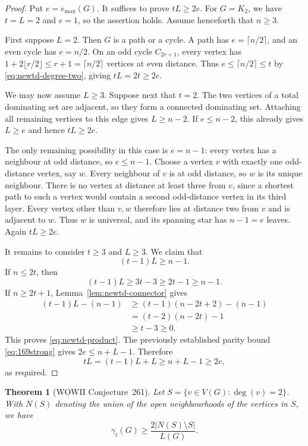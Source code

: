 \documentclass[11pt,a4paper]{article}
\newtheorem{theorem}{Theorem}[section]
\theoremstyle{remark}
\begin{document}
\begin{proof}
Put $e=e_{\max}(G)$. It suffices to prove $tL\geq 2e$.
For $G=K_2$, we have $t=L=2$ and $e=1$, so the assertion holds.
Assume henceforth that $n\geq 3$.

First suppose $L=2$. Then $G$ is a path or a cycle. A path has
$e=\lceil n/2\rceil$, and an even cycle has $e=n/2$. On an odd cycle
$C_{2r+1}$, every vertex has
$1+2\lfloor r/2\rfloor\leq r+1=\lceil n/2\rceil$ vertices at even
distance. Thus $e\leq\lceil n/2\rceil\leq t$ by
\eqref{eq:newtd-degree-two}, giving $tL=2t\geq 2e$.

We may now assume $L\geq 3$. Suppose next that $t=2$. The two vertices
of a total dominating set are adjacent, so they form a connected
dominating set. Attaching all remaining vertices to this edge gives
$L\geq n-2$. If $e\leq n-2$, this already gives $L\geq e$ and hence
$tL\geq 2e$.

The only remaining possibility in this case is $e=n-1$: every vertex
has a neighbour at odd distance, so $e\leq n-1$. Choose a vertex $v$
with exactly one odd-distance vertex, say $w$. Every neighbour of $v$
is at odd distance, so $w$ is its unique neighbour. There is no vertex
at distance at least three from $v$, since a shortest path to such a
vertex would contain a second odd-distance vertex in its third layer.
Every vertex other than $v,w$ therefore lies at distance two from $v$
and is adjacent to $w$. Thus $w$ is universal, and its spanning star
has $n-1=e$ leaves. Again $tL\geq 2e$.

It remains to consider $t\geq 3$ and $L\geq 3$. We claim that
\begin{equation}
\label{eq:newtd-product}
 (t-1)L\geq n-1.
\end{equation}
If $n\leq 2t$, then
\[
 (t-1)L\geq 3t-3\geq 2t-1\geq n-1.
\]
If $n\geq 2t+1$, Lemma~\ref{lem:newtd-connector} gives
\begin{align*}
 (t-1)L-(n-1)
 &\geq (t-1)(n-2t+2)-(n-1)\\
 &= (t-2)(n-2t)-1\\
 &\geq t-3\geq 0.
\end{align*}
This proves \eqref{eq:newtd-product}. The previously established parity
bound \eqref{eq:169strong} gives $2e\leq n+L-1$. Therefore
\[
 tL=(t-1)L+L\geq n+L-1\geq 2e,
\]
as required.
\end{proof}

\begin{theorem}[WOWII Conjecture~261]
\label{thm:newtd-261}
Let $S=\{v\in V(G):\deg(v)=2\}$. With $N(S)$ denoting the union of the
open neighbourhoods of the vertices in $S$, we have
\begin{equation}
\label{eq:newtd-261}
 \gamma_t(G)\geq\frac{2|N(S)\setminus S|}{L(G)}.
\end{equation}
\end{theorem}
\end{document}

